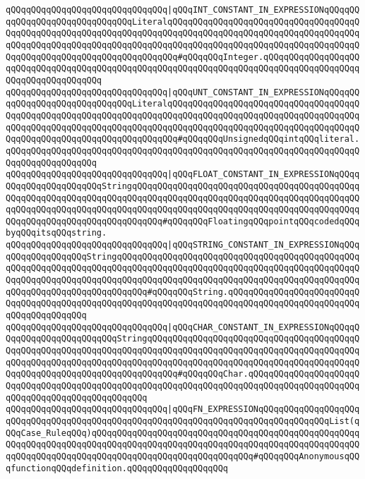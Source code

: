 \verb|qQQqqQQqqQQqqQQqqQQqqQQqqQQqqQQq|\verb#|qQQqINT_CONSTANT_IN_EXPRESSIONqQQqqQQqqQQqqQQqqQQqqQQqqQQqqQQqLiteralqQQqqQQqqQQqqQQqqQQqqQQqqQQqqQQqqQQqqQQqqQQqqQQqqQQqqQQqqQQqqQQqqQQqqQQqqQQqqQQqqQQqqQQqqQQqqQQqqQQqqQQqqQQqqQQqqQQqqQQqqQQqqQQqqQQqqQQqqQQqqQQqqQQqqQQqqQQqqQQqqQQqqQQqqQQqqQQqqQQqqQQqqQQqqQQqqQQqqQQqqQQqqQQqqQQq#\verb|#qQQqqQQqInteger.qQQqqQQqqQQqqQQqqQQqqQQqqQQqqQQqqQQqqQQqqQQqqQQqqQQqqQQqqQQqqQQqqQQqqQQqqQQqqQQqqQQqqQQqqQQqqQQqqQQqqQQqqQQq|\newline
\verb|qQQqqQQqqQQqqQQqqQQqqQQqqQQqqQQq|\verb#|qQQqUNT_CONSTANT_IN_EXPRESSIONqQQqqQQqqQQqqQQqqQQqqQQqqQQqqQQqLiteralqQQqqQQqqQQqqQQqqQQqqQQqqQQqqQQqqQQqqQQqqQQqqQQqqQQqqQQqqQQqqQQqqQQqqQQqqQQqqQQqqQQqqQQqqQQqqQQqqQQqqQQqqQQqqQQqqQQqqQQqqQQqqQQqqQQqqQQqqQQqqQQqqQQqqQQqqQQqqQQqqQQqqQQqqQQqqQQqqQQqqQQqqQQqqQQqqQQqqQQqqQQqqQQqqQQq#\verb|#qQQqqQQqUnsignedqQQqintqQQqliteral.qQQqqQQqqQQqqQQqqQQqqQQqqQQqqQQqqQQqqQQqqQQqqQQqqQQqqQQqqQQqqQQqqQQqqQQqqQQqqQQqqQQqqQQq|\newline
\verb|qQQqqQQqqQQqqQQqqQQqqQQqqQQqqQQq|\verb#|qQQqFLOAT_CONSTANT_IN_EXPRESSIONqQQqqQQqqQQqqQQqqQQqqQQqStringqQQqqQQqqQQqqQQqqQQqqQQqqQQqqQQqqQQqqQQqqQQqqQQqqQQqqQQqqQQqqQQqqQQqqQQqqQQqqQQqqQQqqQQqqQQqqQQqqQQqqQQqqQQqqQQqqQQqqQQqqQQqqQQqqQQqqQQqqQQqqQQqqQQqqQQqqQQqqQQqqQQqqQQqqQQqqQQqqQQqqQQqqQQqqQQqqQQqqQQqqQQqqQQqqQQqqQQq#\verb|#qQQqqQQqFloatingqQQqpointqQQqcodedqQQqbyqQQqitsqQQqstring.|\newline
\verb|qQQqqQQqqQQqqQQqqQQqqQQqqQQqqQQq|\verb#|qQQqSTRING_CONSTANT_IN_EXPRESSIONqQQqqQQqqQQqqQQqqQQqStringqQQqqQQqqQQqqQQqqQQqqQQqqQQqqQQqqQQqqQQqqQQqqQQqqQQqqQQqqQQqqQQqqQQqqQQqqQQqqQQqqQQqqQQqqQQqqQQqqQQqqQQqqQQqqQQqqQQqqQQqqQQqqQQqqQQqqQQqqQQqqQQqqQQqqQQqqQQqqQQqqQQqqQQqqQQqqQQqqQQqqQQqqQQqqQQqqQQqqQQqqQQqqQQqqQQqqQQq#\verb|#qQQqqQQqString.qQQqqQQqqQQqqQQqqQQqqQQqqQQqqQQqqQQqqQQqqQQqqQQqqQQqqQQqqQQqqQQqqQQqqQQqqQQqqQQqqQQqqQQqqQQqqQQqqQQqqQQqqQQqqQQq|\newline
\verb|qQQqqQQqqQQqqQQqqQQqqQQqqQQqqQQq|\verb#|qQQqCHAR_CONSTANT_IN_EXPRESSIONqQQqqQQqqQQqqQQqqQQqqQQqqQQqStringqQQqqQQqqQQqqQQqqQQqqQQqqQQqqQQqqQQqqQQqqQQqqQQqqQQqqQQqqQQqqQQqqQQqqQQqqQQqqQQqqQQqqQQqqQQqqQQqqQQqqQQqqQQqqQQqqQQqqQQqqQQqqQQqqQQqqQQqqQQqqQQqqQQqqQQqqQQqqQQqqQQqqQQqqQQqqQQqqQQqqQQqqQQqqQQqqQQqqQQqqQQqqQQqqQQqqQQq#\verb|#qQQqqQQqChar.qQQqqQQqqQQqqQQqqQQqqQQqqQQqqQQqqQQqqQQqqQQqqQQqqQQqqQQqqQQqqQQqqQQqqQQqqQQqqQQqqQQqqQQqqQQqqQQqqQQqqQQqqQQqqQQqqQQqqQQq|\newline
\verb|qQQqqQQqqQQqqQQqqQQqqQQqqQQqqQQq|\verb#|qQQqFN_EXPRESSIONqQQqqQQqqQQqqQQqqQQqqQQqqQQqqQQqqQQqqQQqqQQqqQQqqQQqqQQqqQQqqQQqqQQqqQQqqQQqqQQqqQQqList(qQQqCase_RuleqQQq)qQQqqQQqqQQqqQQqqQQqqQQqqQQqqQQqqQQqqQQqqQQqqQQqqQQqqQQqqQQqqQQqqQQqqQQqqQQqqQQqqQQqqQQqqQQqqQQqqQQqqQQqqQQqqQQqqQQqqQQqqQQqqQQqqQQqqQQqqQQqqQQqqQQqqQQqqQQqqQQqqQQqqQQqqQQq#\verb|#qQQqqQQqAnonymousqQQqfunctionqQQqdefinition.qQQqqQQqqQQqqQQqqQQq|\newline
